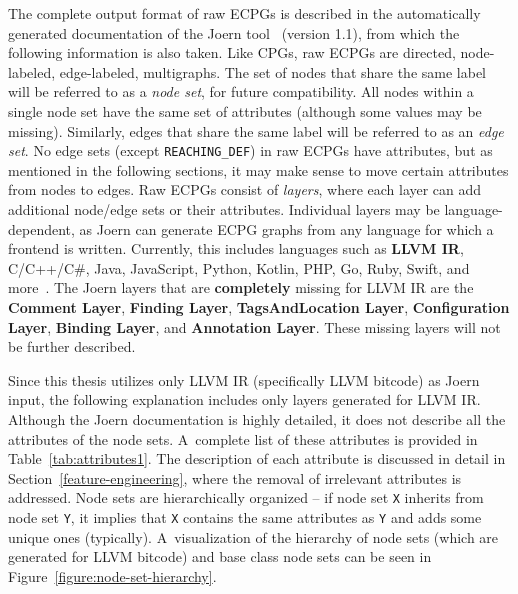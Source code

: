 The complete output format of raw ECPGs is described in the automatically generated documentation of the Joern tool~\cite{joern-cpg-doc} (version 1.1), from which the following information is also taken. Like CPGs, raw ECPGs are directed, node-labeled, edge-labeled, multigraphs. The set of nodes that share the same label will be referred to as a \textit{node set}, for future compatibility. All nodes within a single node set have the same set of attributes (although some values may be missing). Similarly, edges that share the same label will be referred to as an \textit{edge set}. No edge sets (except \texttt{REACHING\_DEF}) in raw ECPGs have attributes, but as mentioned in the following sections, it may make sense to move certain attributes from nodes to edges. Raw ECPGs consist of \textit{layers}, where each layer can add additional node/edge sets or their attributes. Individual layers may be language-dependent, as Joern can generate ECPG graphs from any language for which a frontend is written. Currently, this includes languages such as \textbf{LLVM IR}, C/C++/C\#, Java, JavaScript, Python, Kotlin, PHP, Go, Ruby, Swift, and more~\cite{joern-cpg-doc, joern-doc}. The Joern layers that are \textbf{completely} missing for LLVM IR are the \textbf{Comment Layer}, \textbf{Finding Layer}, \textbf{TagsAndLocation Layer}, \textbf{Configuration Layer}, \textbf{Binding Layer}, and \textbf{Annotation Layer}. These missing layers will not be further described.

Since this thesis utilizes only LLVM IR (specifically LLVM bitcode) as Joern input, the following explanation includes only layers generated for LLVM IR. Although the Joern documentation is highly detailed, it does not describe all the attributes of the node sets. A~complete list of these attributes is provided in Table~\ref{tab:attributes1}. The description of each attribute is discussed in detail in Section~\ref{feature-engineering}, where the removal of irrelevant attributes is addressed. Node sets are hierarchically organized -- if node set \texttt{X} inherits from node set \texttt{Y}, it implies that \texttt{X} contains the same attributes as \texttt{Y} and adds some unique ones (typically). A~visualization of the hierarchy of node sets (which are generated for LLVM bitcode) and base class node sets can be seen in Figure~\ref{figure:node-set-hierarchy}.

